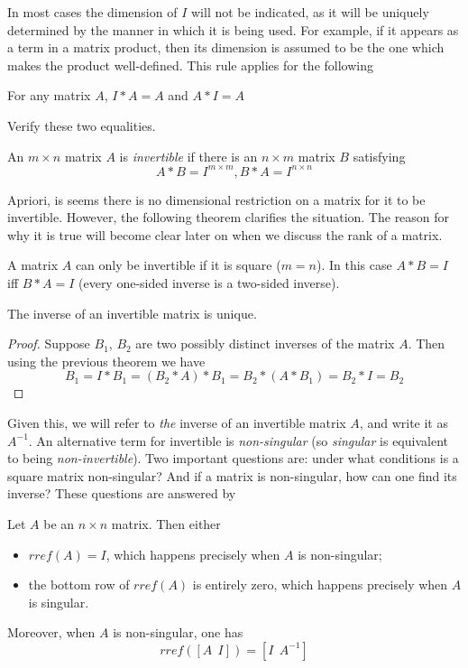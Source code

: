 \documentclass{ximera}
\begin{document}
In most cases the dimension of $I$ will not be indicated, as it will be uniquely determined by the manner in which it is being used. For example, if it appears as a term in a matrix product, then its dimension is assumed to be the one which makes the product well-defined. This rule applies for the following 

\begin{proposition} For any matrix $A$, $I*A = A$ and $A*I = A$
\end{proposition}

\begin{exercise} Verify these two equalities.
\end{exercise}

\begin{definition} An $m\times n$ matrix $A$ is {\it invertible} if there is an $n\times m$ matrix $B$ satisfying
\[
A*B = I^{m\times m}, B*A = I^{n\times n}
\]
\end{definition}

Apriori, is seems there is no dimensional restriction on a matrix for it to be invertible. However, the following theorem clarifies the situation. The reason for why it is true will become clear later on when we discuss the rank of a matrix.

\begin{theorem} A matrix $A$ can only be invertible if it is square ($m = n$). In this case $A*B =I$ iff $B*A = I$ (every one-sided inverse is a two-sided inverse).
\end{theorem}

\begin{proposition} The inverse of an invertible matrix is unique.
\end{proposition}

\begin{proof} Suppose $B_1$, $B_2$ are two possibly distinct inverses of the matrix $A$. Then using the previous theorem we have
\[
B_1 = I*B_1 = (B_2*A)*B_1 = B_2*(A*B_1) = B_2*I = B_2
\]
\end{proof}

Given this, we will refer to {\it the} inverse of an invertible matrix $A$, and write it as $A^{-1}$. An alternative term for invertible is {\it non-singular} (so {\it singular} is equivalent to being  {\it non-invertible}). Two important questions are: under what conditions is a square matrix non-singular? And if a matrix is non-singular, how can one find its inverse? These questions are answered by 

\begin{theorem} Let $A$ be an $n\times n$ matrix. Then either
\begin{itemize}
\item $rref(A) = I$, which happens precisely when $A$ is non-singular;
\item the bottom row of $rref(A)$ is entirely zero, which happens precisely when $A$ is singular.
\end{itemize}
Moreover, when $A$ is non-singular, one has
\[
rref([A\ \ I]) = [I\ \ A^{-1}]
\]
\end{theorem}
\end{document}

